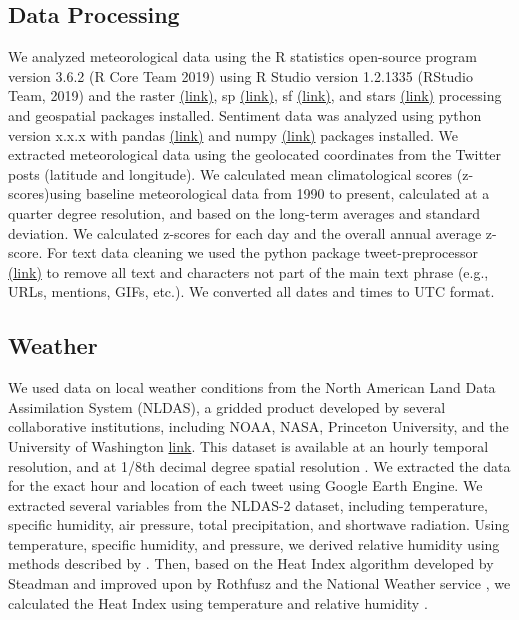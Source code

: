 \documentclass{article}
\begin{document}
\subsection{Data Processing}
We analyzed meteorological data using the R statistics open-source program version 3.6.2  (R Core Team 2019) using R Studio version 1.2.1335 (RStudio Team, 2019) and the raster \href{https://www.rdocumentation.org/packages/raster/versions/3.3-13}{(link)}, sp \href{https://cran.r-project.org/web/packages/sp/index.html}{(link)}, sf \href{https://cran.r-project.org/web/packages/sf/index.html}{(link)}, and stars \href{https://cran.r-project.org/web/packages/stars/index.html}{(link)} processing and geospatial packages installed. Sentiment data was analyzed using python version x.x.x with pandas \href{https://pandas.pydata.org/}{(link)} and numpy \href{https://numpy.org/}{(link)} packages installed. We extracted meteorological data using the geolocated coordinates from the Twitter posts (latitude and longitude). We calculated mean climatological scores (z-scores)using baseline meteorological data from 1990 to present, calculated at a quarter degree resolution, and based on the long-term averages and standard deviation. We calculated z-scores for each day and the overall annual average z-score. For text data cleaning we used the python package tweet-preprocessor \href{https://pypi.org/project/tweet-preprocessor/}{(link)} to remove all text and characters not part of the main text phrase (e.g., URLs, mentions, GIFs, etc.). We converted all dates and times to UTC format.

\subsection{Weather}
We used data on local weather conditions from the North American Land Data Assimilation System (NLDAS), a gridded product developed by several collaborative institutions, including NOAA, NASA, Princeton University, and the University of Washington \href{https://agupubs.onlinelibrary.wiley.com/doi/full/10.1029/2011JD016048}{link}.  This dataset is available at an hourly temporal resolution, and at 1/8th decimal degree spatial resolution \cite{xia_continental-scale_2012}.  We extracted the data for the exact hour and location of each tweet using Google Earth Engine. We extracted several variables from the NLDAS-2 dataset, including temperature, specific humidity, air pressure, total precipitation, and shortwave radiation.  Using temperature, specific humidity, and pressure, we derived relative humidity using methods described by  \cite{bolton_computation_1980}. Then, based on the Heat Index algorithm developed by Steadman \cite{steadman_assessment_1979} and improved upon by Rothfusz and the National Weather service \cite{rothfusz_heat_1990}, we calculated the Heat Index using temperature and relative humidity \cite{heo_comparison_2019}.
\end{document}
